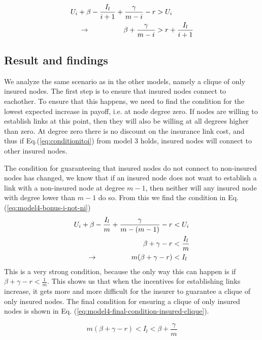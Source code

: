 \begin{eqnarray}
U_{i}+\beta-\frac{I_{l}}{i+1}+\frac{\gamma}{m-i}-r&>U_{i} \nonumber \\ 
\llap{$\rightarrow$\hspace{50pt}}\beta+\frac{\gamma}{m-i}&>r+\frac{I_{l}}{i+1}
\label{eq:model4-bonus-i-to-ni-final}
\end{eqnarray}

\subsection{Result and findings}
We analyze the same scenario as in the other models, namely a clique of only insured nodes. The first step is to ensure that insured nodes connect to eachother. To ensure that this happens, we need to find the condition for the lowest expected increase in payoff, i.e. at node degree zero. If nodes are willing to establish links at this point, then they will also be willing at all degrees higher than zero.
At degree zero there is no discount on the insurance link cost, and thus if Eq.(\ref{eq:conditionitoi}) from model 3 holds, insured nodes will connect to other insured nodes.

The condition for guaranteeing that insured nodes do not connect to non-insured nodes has changed, we know that if an insured node does not want to establish a link with a non-insured node at degree $m-1$, then neither will any insured node with degree lower than $m-1$ do so. From this we find the condition in Eq.(\ref{eq:model4-bonus-i-not-ni})
\begin{eqnarray}
U_{i}+\beta-\frac{I_{l}}{m}+\frac{\gamma}{m-(m-1)}-r&<U_{i} \nonumber \\ 
\beta+\gamma-r&<\frac{I_{l}}{m}\nonumber \\ 
\llap{$\rightarrow$\hspace{50pt}}m(\beta +\gamma-r)&<I_{l}\nonumber
\label{eq:model4-bonus-i-not-ni}
\end{eqnarray}
This is a very strong condition, because the only way this can happen is if $\beta+\gamma-r<\frac{1}{m}$.  This shows us that when the incentives for establishing links increase, it gets more and more difficult for the insurer to guarantee a clique of only insured nodes. 
The final condition for ensuring a clique of only insured nodes is shown in Eq. (\ref{eq:model4-final-condition-insured-clique}).

\begin{equation}
m(\beta +\gamma-r)<I_{l}<\beta+\frac{\gamma}{m}
\label{eq:model4-final-condition-insured-clique}
\end{equation}

